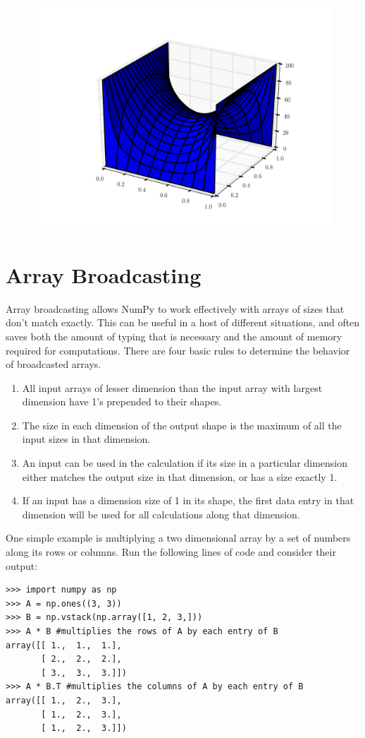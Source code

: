 \begin{problem}
\begin{figure}[H]
\centering
\includegraphics[width=.75\textwidth]{laplace.pdf}
\end{figure}
\end{problem}

\section*{Array Broadcasting}
Array broadcasting allows NumPy to work effectively with arrays of sizes that don't match 
exactly. This can be useful in a host of different situations, and often saves both the 
amount of typing that is necessary and the amount of memory required for computations. 
There are four basic rules to determine the behavior of broadcasted arrays.
\begin{enumerate}
\item All input arrays of lesser dimension than the input array with largest dimension 
    have 1's prepended to their shapes.
\item The size in each dimension of the output shape is the maximum of all the input sizes 
    in that dimension.
\item An input can be used in the calculation if its size in a particular dimension either 
    matches the output size in that dimension, or has a size exactly 1.
\item If an input has a dimension size of 1 in its shape, the first data entry in that 
    dimension will be used for all calculations along that dimension.
\end{enumerate}

One simple example is multiplying a two dimensional array by a set of numbers along its rows or columns.
Run the following lines of code and consider their output:
\begin{lstlisting}
>>> import numpy as np
>>> A = np.ones((3, 3))
>>> B = np.vstack(np.array([1, 2, 3,]))
>>> A * B #multiplies the rows of A by each entry of B
array([[ 1.,  1.,  1.],
       [ 2.,  2.,  2.],
       [ 3.,  3.,  3.]])
>>> A * B.T #multiplies the columns of A by each entry of B
array([[ 1.,  2.,  3.],
       [ 1.,  2.,  3.],
       [ 1.,  2.,  3.]])
\end{lstlisting}

